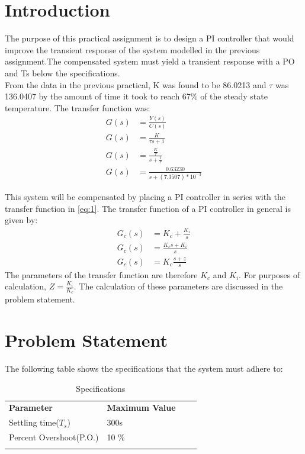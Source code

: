 
\chapter{Introduction}
The purpose of this practical assignment is to design a PI controller that would improve the transient response of the system modelled in
the previous assignment.The compensated system must yield a transient response with a PO and Ts below the specifications.\\
From the data in the previous practical, K was found to be 86.0213 and $\tau$ was 136.0407 by the amount of time it took to reach 67\% of the steady state temperature. The transfer function was:
 \begin{align}\label{eq:1}
 G(s) &= \frac{Y(s)}{C(s)}\nonumber\\
 G(s) & = \frac{K}{\tau s + 1}\nonumber\\
 G(s) & = \frac{\frac{K}{\tau}}{s + \frac{1}{\tau}}\nonumber\\
 G(s) &= \frac{0.63230}{s + (7.3507)*10^{-3}}
 \end{align}
 
 This system will be compensated by placing a PI controller in series with the transfer function in \ref{eq:1}. The transfer function of a PI controller in general is given by:
 \begin{align}\label{eq:2}
G_{c}(s) &= K_{c}+ \frac{K_{i}}{s}\nonumber\\
G_{c}(s) &= \frac{K_c s + K_i}{s}\nonumber\\
G_{c}(s) &= K_c\frac{s + z}{s}
\end{align}
The parameters of the transfer function are therefore $K_c$ and $K_i$. For purposes of calculation, $Z = \frac{K_i}{K_c}$.
The calculation of these parameters are discussed in the problem statement.



\chapter{Problem Statement}
The following table shows the specifications that the system must adhere to:

\begin{table}[h]
\centering
\caption{Specifications}
\label{tbl:1}
\begin{tabular}{llll}
\cline{1-2}
\multicolumn{1}{|l|}{\textbf{Parameter}}      & \multicolumn{1}{l|}{\textbf{Maximum Value}} &  &  \\ \cline{1-2}
\multicolumn{1}{|l|}{Settling time($T_s$)}    & \multicolumn{1}{l|}{300s}                   &  &  \\ \cline{1-2}
\multicolumn{1}{|l|}{Percent Overshoot(P.O.)} & \multicolumn{1}{l|}{10 \%}                       &  &  \\ \cline{1-2}
                                              &                                             &  & 
\end{tabular}
\end{table}

